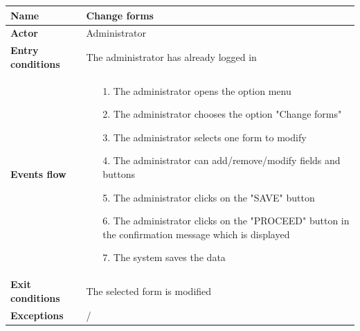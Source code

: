 \begin{table}[]
\begin{adjustbox}{width=\textwidth}
\footnotesize
\begin{tabular}{|p{}|p{}|}
\hline
\textbf{Name}             &  Change forms\\ \hline
\textbf{Actor}            &  Administrator\\ \hline
\textbf{Entry conditions} &  The administrator has already logged in\\ \hline
\textbf{Events flow}      &
	\begin{itemize}
		\item[1.] The administrator opens the option menu
		\item[2.] The administrator chooses the option "Change forms"
		\item[3.] The administrator selects one form to modify
		\item[4.] The administrator can add/remove/modify fields and buttons
		\item[5.] The administrator clicks on the "SAVE" button
		\item[6.] The administrator clicks on the "PROCEED" button in the confirmation message which is displayed
		\item[7.] The system saves the data
	\end{itemize}\\ \hline
\textbf{Exit conditions}  &  The selected form is modified\\ \hline
\textbf{Exceptions}       &  /\\ \hline
\end{tabular}
\end{adjustbox}
\end{table}

\clearpage

